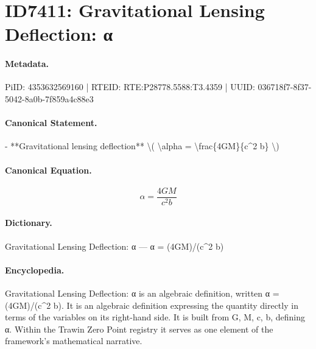 \section*{ID7411: Gravitational Lensing Deflection: α}
\paragraph{Metadata.}
PiID: 4353632569160 | RTEID: RTE:P28778.5588:T3.4359 | UUID: 036718f7-8f37-5042-8a0b-7f859a4c88e3

\paragraph{Canonical Statement.}
- **Gravitational lensing deflection** \textbackslash{}( \textbackslash{}alpha = \textbackslash{}frac\{4GM\}\{c\textasciicircum{}2 b\} \textbackslash{})

\paragraph{Canonical Equation.}
\[
\alpha = \frac{4GM}{c^2 b}
\]

\paragraph{Dictionary.}
Gravitational Lensing Deflection: α — α = (4GM)/(c\textasciicircum{}2 b)

\paragraph{Encyclopedia.}
Gravitational Lensing Deflection: α is an algebraic definition, written α = (4GM)/(c\textasciicircum{}2 b). It is an algebraic definition expressing the quantity directly in terms of the variables on its right-hand side. It is built from G, M, c, b, defining α. Within the Trawin Zero Point registry it serves as one element of the framework's mathematical narrative.
